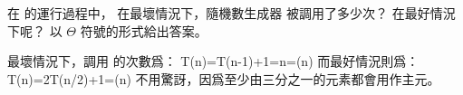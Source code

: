 \startEXERCISE
在  的運行過程中，
在最壞情況下，隨機數生成器  被調用了多少次？
在最好情況下呢？
以 $\Theta$ 符號的形式給出答案。
\stopEXERCISE

\startANSWER
最壞情況下，調用  的次數爲：
\startformula
T(n)=T(n-1)+1=n=\Theta(n)
\stopformula
而最好情況則爲：
\startformula
T(n)=2T(n/2)+1=\Theta(n)
\stopformula
不用驚訝，因爲至少由三分之一的元素都會用作主元。
\stopANSWER
